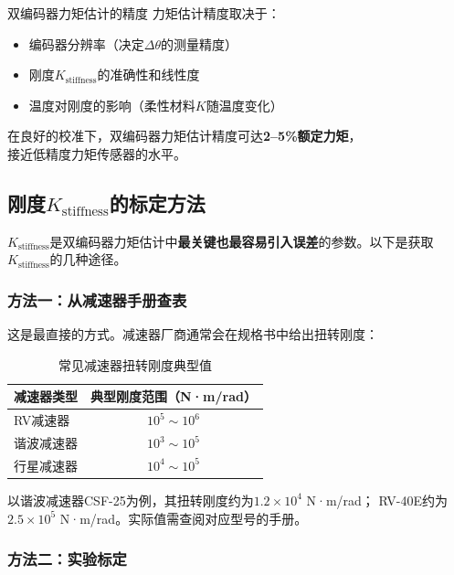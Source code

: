 \begin{engineeringbox}{双编码器力矩估计的精度}
力矩估计精度取决于：\\
\begin{itemize}
  \item 编码器分辨率（决定$\Delta\theta$的测量精度）
  \item 刚度$K_{\text{stiffness}}$的准确性和线性度
  \item 温度对刚度的影响（柔性材料$K$随温度变化）
\end{itemize}
在良好的校准下，双编码器力矩估计精度可达\textbf{2--5\%额定力矩}，\\接近低精度力矩传感器的水平。
\end{engineeringbox}

\subsection{刚度$K_{\text{stiffness}}$的标定方法}

$K_{\text{stiffness}}$是双编码器力矩估计中\textbf{最关键也最容易引入误差}的参数。以下是获取$K_{\text{stiffness}}$的几种途径。

\subsubsection{方法一：从减速器手册查表}

这是最直接的方式。减速器厂商通常会在规格书中给出扭转刚度：

\begin{table}[H]
\centering
\begin{tabular}{lc}
\toprule
\textbf{减速器类型} & \textbf{典型刚度范围（N·m/rad）} \\
\midrule
RV减速器 & $10^5 \sim 10^6$ \\
谐波减速器 & $10^3 \sim 10^5$ \\
行星减速器 & $10^4 \sim 10^5$ \\
\bottomrule
\end{tabular}
\caption{常见减速器扭转刚度典型值}
\label{tab:typical_stiffness}
\end{table}

以谐波减速器CSF-25为例，其扭转刚度约为$1.2 \times 10^4$ N·m/rad；\newline
RV-40E约为$2.5 \times 10^5$ N·m/rad。实际值需查阅对应型号的手册。

\subsubsection{方法二：实验标定}

